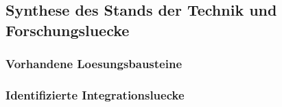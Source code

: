 \subsection{Synthese des Stands der Technik und Forschungsluecke}
\label{sec:research_gap}

%
%


\subsubsection{Vorhandene Loesungsbausteine}
\label{sec:existing_solution_blocks}

%
%
%
%
%
%
%
%
%
%
%
%


\subsubsection{Identifizierte Integrationsluecke}
\label{sec:integration_gap}

